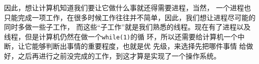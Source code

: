 因此，想让计算机知道我们要让它做什么事就还得需要进程，当然，
一个进程也
只能完成一项工作，在很多时候工作往往并不简单，因此，我们想让进程尽可能的同时多做一些子工作，
而这些“子工作”就是我们熟悉的线程。现在有了进程以及线程，但是计算机仍然在做一个\texttt{while(1)}的循
环，所以还需要给计算机一个中断，让它能够判断出事情的重要程度，也就是优
先级，来选择先把哪件事情
给做好，之后再进行之前没完成的工作，到这才算是实现了一个操作系统\cite{yy2009}。


